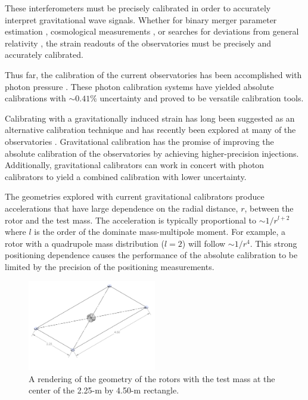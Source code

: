 \documentclass[superscriptaddress, twocolumn, prd]{revtex4-1}
\begin{document}
These interferometers must be precisely calibrated in order to accurately interpret gravitational wave signals. Whether for binary merger parameter estimation \cite{abbott2020population}, cosmological measurements \cite{abbott2021gravitational, ligo2017gravitational}, or searches for deviations from general relativity \cite{abbott2020tests}, the strain readouts of the observatories must be precisely and accurately calibrated.

Thus far, the calibration of the current observatories has been accomplished with photon pressure \cite{PCal}. These photon calibration systems have yielded absolute calibrations with $\sim0.41\%$ uncertainty\cite{Bhattacharjee_2020} and proved to be versatile calibration tools. 

Calibrating with a gravitationally induced strain has long been suggested as an alternative calibration technique \cite{hirakawa1980dynamical, kuroda1985experimental, mio1987experimental, astone1991evaluation, astone1998experimental, Matone_2007} and has recently been explored at many of the observatories \cite{Estevez_2018, estevez2021newtonian, PhysRevD.98.022005, ncal}. Gravitational calibration has the promise of improving the absolute calibration of the observatories by achieving higher-precision injections. Additionally, gravitational calibrators can work in concert with photon calibrators to yield a combined calibration with lower uncertainty.

The geometries explored with current gravitational calibrators \cite{Estevez_2018, estevez2021newtonian, PhysRevD.98.022005, ncal} produce accelerations that have large dependence on the radial distance, $r$, between the rotor and the test mass. The acceleration is typically proportional to $\sim1/r^{l+2}$ where $l$ is the order of the dominate mass-multipole moment. For example, a rotor with a quadrupole mass distribution ($l=2$) will follow $\sim1/r^4$. This strong positioning dependence causes the performance of the absolute calibration to be limited by the precision of the positioning measurements. 

\begin{figure}[!h]
\centering \includegraphics[width=0.5\textwidth]{Super4_Model.pdf}
\caption{A rendering of the geometry of the rotors with the test mass at the center of the 2.25-m by 4.50-m rectangle.}
\label{cad} 
\end{figure}
\end{document}
